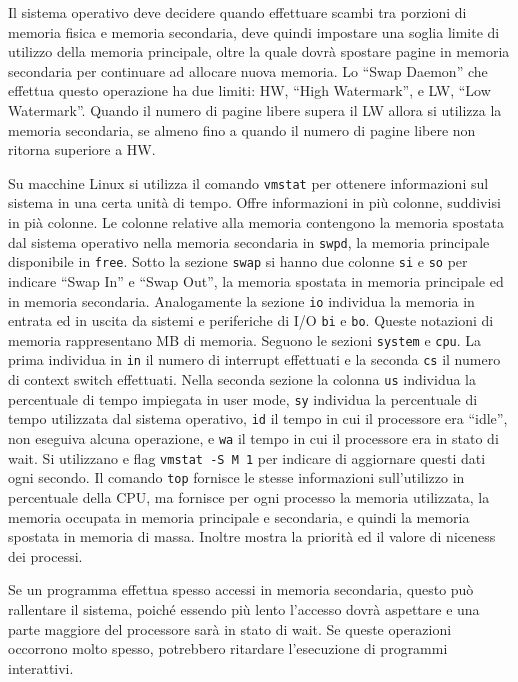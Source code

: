 \documentclass{article}
\numberwithin{equation}{subsection}
\begin{document}
Il sistema operativo deve decidere quando effettuare scambi tra porzioni di memoria fisica e memoria secondaria, deve quindi impostare una soglia limite di utilizzo 
della memoria principale, oltre la quale dovrà spostare pagine in memoria secondaria per continuare ad allocare nuova memoria. Lo ``Swap Daemon'' che effettua questo 
operazione ha due limiti: HW, ``High Watermark'', e LW, ``Low Watermark''. Quando il numero di pagine libere supera il LW allora si utilizza la memoria secondaria, 
se almeno fino a quando il numero di pagine libere non ritorna superiore a HW. 

Su macchine Linux si utilizza il comando \verb|vmstat| per ottenere informazioni sul sistema in una certa unità di tempo. Offre informazioni in più 
colonne, suddivisi in pià colonne. Le colonne relative alla memoria contengono la memoria spostata dal sistema operativo nella memoria secondaria in \verb|swpd|, la memoria principale 
disponibile in \verb|free|. Sotto la sezione \verb|swap| si hanno due colonne \verb|si| e \verb|so| per indicare ``Swap In'' e ``Swap Out'', la memoria spostata in memoria 
principale ed in memoria secondaria. Analogamente la sezione \verb|io| individua la memoria in entrata ed in uscita da sistemi e periferiche di I/O \verb|bi| e \verb|bo|. 
Queste notazioni di memoria rappresentano MB di memoria. Seguono le sezioni \verb|system| e \verb|cpu|. La prima individua in \verb|in| il numero di interrupt 
effettuati e la seconda \verb|cs| il numero di context switch effettuati. Nella seconda sezione la colonna \verb|us| individua la percentuale di tempo impiegata 
in user mode, \verb|sy| individua la percentuale di tempo utilizzata dal sistema operativo, \verb|id| il tempo in cui il processore era ``idle'', non eseguiva alcuna 
operazione, e \verb|wa| il tempo in cui il processore era in stato di wait. 
Si utilizzano e flag \verb|vmstat -S M 1| per indicare di aggiornare questi dati ogni secondo. Il comando \verb|top| fornisce le stesse informazioni sull'utilizzo in 
percentuale della CPU, ma fornisce per ogni processo la memoria utilizzata, la memoria occupata in memoria principale e secondaria, e quindi la memoria spostata 
in memoria di massa. Inoltre mostra la priorità ed il valore di niceness dei processi. 


Se un programma effettua spesso accessi in memoria secondaria, questo può rallentare il sistema, poiché essendo più lento l'accesso dovrà aspettare e una parte maggiore 
del processore sarà in stato di wait. Se queste operazioni occorrono molto spesso, potrebbero ritardare l'esecuzione di programmi interattivi. 
\end{document}
